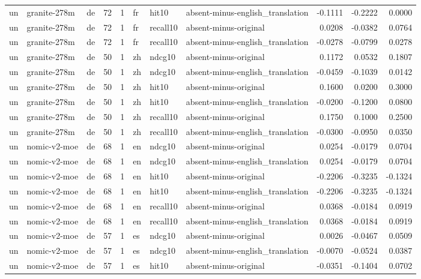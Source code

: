 \begin{tabular}{lllrrlllrrr}
un & granite-278m & de & 72 & 1 & fr & hit10 & absent-minus-english\_translation & -0.1111 & -0.2222 & 0.0000 \\
un & granite-278m & de & 72 & 1 & fr & recall10 & absent-minus-original & 0.0208 & -0.0382 & 0.0764 \\
un & granite-278m & de & 72 & 1 & fr & recall10 & absent-minus-english\_translation & -0.0278 & -0.0799 & 0.0278 \\
un & granite-278m & de & 50 & 1 & zh & ndcg10 & absent-minus-original & 0.1172 & 0.0532 & 0.1807 \\
un & granite-278m & de & 50 & 1 & zh & ndcg10 & absent-minus-english\_translation & -0.0459 & -0.1039 & 0.0142 \\
un & granite-278m & de & 50 & 1 & zh & hit10 & absent-minus-original & 0.1600 & 0.0200 & 0.3000 \\
un & granite-278m & de & 50 & 1 & zh & hit10 & absent-minus-english\_translation & -0.0200 & -0.1200 & 0.0800 \\
un & granite-278m & de & 50 & 1 & zh & recall10 & absent-minus-original & 0.1750 & 0.1000 & 0.2500 \\
un & granite-278m & de & 50 & 1 & zh & recall10 & absent-minus-english\_translation & -0.0300 & -0.0950 & 0.0350 \\
un & nomic-v2-moe & de & 68 & 1 & en & ndcg10 & absent-minus-original & 0.0254 & -0.0179 & 0.0704 \\
un & nomic-v2-moe & de & 68 & 1 & en & ndcg10 & absent-minus-english\_translation & 0.0254 & -0.0179 & 0.0704 \\
un & nomic-v2-moe & de & 68 & 1 & en & hit10 & absent-minus-original & -0.2206 & -0.3235 & -0.1324 \\
un & nomic-v2-moe & de & 68 & 1 & en & hit10 & absent-minus-english\_translation & -0.2206 & -0.3235 & -0.1324 \\
un & nomic-v2-moe & de & 68 & 1 & en & recall10 & absent-minus-original & 0.0368 & -0.0184 & 0.0919 \\
un & nomic-v2-moe & de & 68 & 1 & en & recall10 & absent-minus-english\_translation & 0.0368 & -0.0184 & 0.0919 \\
un & nomic-v2-moe & de & 57 & 1 & es & ndcg10 & absent-minus-original & 0.0026 & -0.0467 & 0.0509 \\
un & nomic-v2-moe & de & 57 & 1 & es & ndcg10 & absent-minus-english\_translation & -0.0070 & -0.0524 & 0.0387 \\
un & nomic-v2-moe & de & 57 & 1 & es & hit10 & absent-minus-original & -0.0351 & -0.1404 & 0.0702 \\

\end{tabular}

